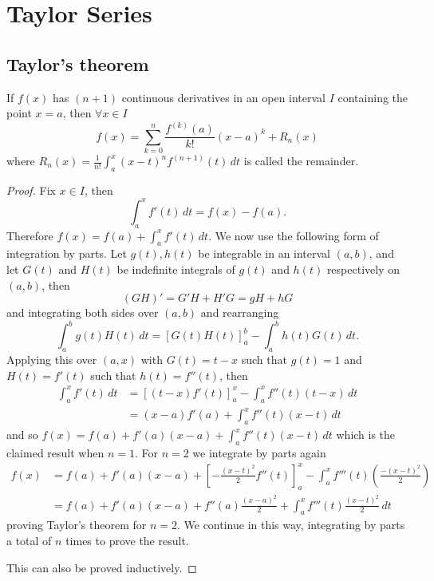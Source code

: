 \documentclass[10pt, a4paper]{article}
\begin{document}
\newpage

\section{Taylor Series}

\subsection{Taylor's theorem}

\begin{theorem}
    If $f(x)$ has $(n + 1)$ continuous derivatives in an open interval $I$ containing the point $x = a$,
    then $\forall x \in I$
    \[
    f(x) = \sum_{k = 0}^{n}\frac{f ^ {(k)}(a)}{k!}(x - a) ^ k + R_n(x)
    \]
    where $R_n(x) = \frac{1}{n!}\int_{a}^{x}(x - t) ^ n f ^ {(n + 1)}(t)\,dt$ is called the remainder.
    \begin{proof}
        Fix $x \in I$,
        then
        \[
        \int_{a}^{x}f'(t)\,dt = f(x) - f(a).
        \]
        Therefore $f(x) = f(a) + \int_{a}^{x}f'(t)\,dt$.
        We now use the following form of integration by parts.
        Let $g(t), h(t)$ be integrable in an interval $(a, b)$,
        and let $G(t)$ and $H(t)$ be indefinite integrals of $g(t)$ and $h(t)$ respectively on $(a, b)$,
        then
        \[
        (G H)' = G'H + H'G = gH + hG
        \]
        and integrating both sides over $(a, b)$ and rearranging
        \[
        \int_{a}^{b}g(t)H(t)\,dt = [G(t)H(t)]_{a}^{b} - \int_{a}^{b}h(t)G(t)\,dt.
        \]
        Applying this over $(a, x)$ with $G(t) = t - x$ such that $g(t) = 1$ and $H(t) = f'(t)$ such that $h(t) = f''(t)$,
        then
        \begin{align*}
            \int_{a}^{x}f'(t)\,dt &= [(t - x)f'(t)]_{a}^{x} - \int_{a}^{x}f''(t)(t - x)\,dt \\
            &= (x - a)f'(a) + \int_{a}^{x}f''(t)(x - t)\,dt
        \end{align*}
        and so $f(x) = f(a) + f'(a)(x - a) + \int_{a}^{x}f''(t)(x - t)\,dt$ which is the claimed result when $n = 1$.
        For $n = 2$ we integrate by parts again
        \begin{align*}
            f(x) &= f(a) + f'(a)(x - a) + \left[-\frac{(x - t) ^ 2}{2}f''(t)\right]_{a}^{x} - \int_{a}^{x}f'''(t)\left(\frac{-(x - t) ^ 2}{2}\right) \\
            &= f(a) + f'(a)(x - a) + f''(a)\frac{(x - a) ^ 2}{2} + \int_{a}^{x}f'''(t)\frac{(x - t) ^ 2}{2}\,dt
        \end{align*}
        proving Taylor's theorem for $n = 2$.
        We continue in this way,
        integrating by parts a total of $n$ times to prove the result.

        This can also be proved inductively.
    \end{proof}
\end{theorem}
\end{document}
